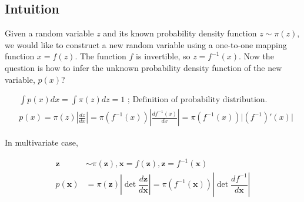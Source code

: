 \subsection{Intuition}
Given a random variable $z$ and its known probability density function $z\sim \pi(z)$, we would like to construct a new random variable using a one-to-one mapping function $x=f(z)$. The function $f$ is invertible, so $z = f^{-1}(x)$. Now the question is how to infer the unknown probability density function of the new variable, $p(x)$?

$$
\begin{aligned}
& \int p(x)dx = \int \pi(z)dz = 1 \scriptstyle{\text{   ; Definition of probability distribution.}}\\
& p(x) = \pi(z) \left\vert\frac{dz}{dx}\right\vert = \pi(f^{-1}(x)) \left\vert\frac{d f^{-1}(x)}{dx}\right\vert = \pi(f^{-1}(x)) \vert (f^{-1})'(x) \vert
\end{aligned}$$

In multivariate case, 

\begin{align}
\mathbf{z} &\sim \pi(\mathbf{z}), \mathbf{x} = f(\mathbf{z}), \mathbf{z} = f^{-1}(\mathbf{x}) \\
p(\mathbf{x}) 
&= \pi(\mathbf{z}) \left\vert \det \dfrac{d \mathbf{z}}{d \mathbf{x}} \right\vert  
= \pi(f^{-1}(\mathbf{x})) \left\vert \det \dfrac{d f^{-1}}{d \mathbf{x}} \right\vert
\end{align}








